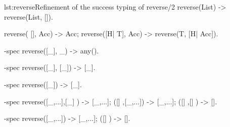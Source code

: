 \begin{console}{lst:reverse}{Refinement of the success typing of reverse/2}
reverse(List) ->
  reverse(List, []).

reverse(    [], Acc) -> Acc;
reverse([H| T], Acc) -> reverse(T, [H| Acc]).

-spec reverse([_], _) -> any().

-spec reverse([_], [_]) -> [_].

-spec reverse([_]) -> [_].

-spec reverse([_,...],[_]    ) -> [_,...];
             ([]     ,[_,...]) -> [_,...]; 
             ([]     ,[]     ) -> [].

-spec reverse([_,...]) -> [_,...];
             ([]     ) -> [].
\end{console}
